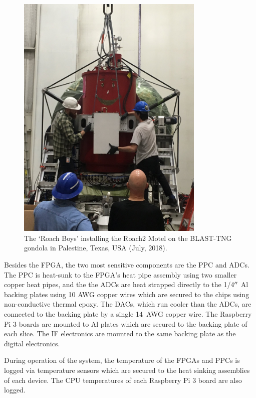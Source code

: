 \begin{figure}[!htbp]
\centering
\includegraphics[width=0.8\textwidth]{figures/readout/hardware/installing_roaches}
\caption{The `Roach Boys' installing the Roach2 Motel on the BLAST-TNG gondola in Palestine, Texas, USA (July, 2018).}
\label{fig:mounting roaches}
\end{figure}

Besides the FPGA, the two most sensitive components are the PPC and ADCs. The PPC is heat-sunk to the FPGA's heat pipe assembly using two smaller copper heat pipes, and the the ADCs are heat strapped directly to the 1/4$\operatorname{^{\prime\prime}}$ Al backing plates using 10 AWG copper wires which are secured to the chips using non-conductive thermal epoxy. The DACs, which run cooler than the ADCs, are connected to the backing plate by a single 14~AWG copper wire. The Raspberry Pi 3 boards are mounted to Al plates which are secured to the backing plate of each slice. The IF electronics are mounted to the same backing plate as the digital electronics.

During operation of the system, the temperature of the FPGAs and PPCs is logged via temperature sensors which are secured to the heat sinking assemblies of each device. The CPU temperatures of each Raspberry Pi 3 board are also logged.


